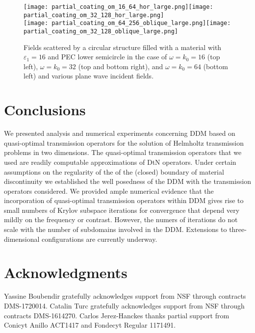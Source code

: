 \documentclass[11pt]{article}
\numberwithin{equation}{section}
\begin{document}
\begin{figure}
\centering
\texttt{[image: partial\_coating\_om\_16\_64\_hor\_large.png]}\texttt{[image: partial\_coating\_om\_32\_128\_hor\_large.png]}\\
\texttt{[image: partial\_coating\_om\_64\_256\_oblique\_large.png]}\texttt{[image: partial\_coating\_om\_32\_128\_oblique\_large.png]}
\caption{Fields scattered by a circular structure filled with a material with $\varepsilon_1=16$ and PEC lower semicircle in the case of $\omega=k_0=16$ (top left), $\omega=k_0=32$ (top and bottom right), and $\omega=k_0=64$ (bottom left) and various plane wave incident fields.}
\label{fig:near_fields}
\end{figure}

\section{Conclusions}\label{conclu}

We presented analysis and numerical experiments concerning DDM based on quasi-optimal transmission operators for the solution of Helmholtz transmission problems in two dimensions. The quasi-optimal transmission operators that we used are readily computable approximations of DtN operators. Under certain assumptions on the regularity of the of the (closed) boundary of material discontinuity we established the well posedness of the DDM with the transmission operators considered. We provided ample numerical evidence that the incorporation of quasi-optimal transmission operators within DDM gives rise to small numbers of Krylov subspace iterations for convergence that depend very mildly on the frequency or contrast. However, the numers of iterations do not scale with the number of subdomains involved in the DDM. Extensions to three-dimensional configurations are currently underway. 

\section*{Acknowledgments}
Yassine Boubendir gratefully acknowledges support from NSF through contracts DMS-1720014. Catalin Turc gratefully acknowledges support from NSF through contracts DMS-1614270. Carlos Jerez-Hanckes thanks partial support from Conicyt Anillo ACT1417 and Fondecyt Regular 1171491.

 


\end{document}
